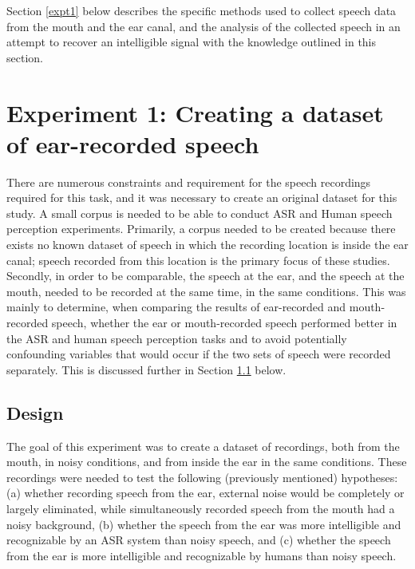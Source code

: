 \documentclass[dissertation,copyright]{uathesis}
\begin{document}
Section \ref{expt1} below describes the specific methods used to collect speech data from the mouth and the ear canal, and the analysis of the collected speech in an attempt to recover an intelligible signal with the knowledge outlined in this section.


\section{Experiment 1: Creating a dataset of ear-recorded speech\label{expt1}}

There are numerous constraints and requirement for the speech recordings required for this task, and it was necessary to create an original dataset for this study.  A small corpus is needed to be able to conduct ASR and Human speech perception experiments.  Primarily, a corpus needed to be created because there exists no known dataset of speech in which the recording location is inside the ear canal; speech recorded from this location is the primary focus of these studies.  Secondly, in order to be comparable, the speech at the ear, and the speech at the mouth, needed to be recorded at the same time, in the same conditions.  This was mainly to determine, when comparing the results of ear-recorded and mouth-recorded speech, whether the ear or mouth-recorded speech performed better in the ASR and human speech perception tasks and to avoid potentially confounding variables that would occur if the two sets of speech were recorded separately. This is discussed further in Section \ref{exp1design} below.

\subsection{Design}
\label{exp1design}
   
The goal of this experiment was to create a dataset of recordings, both from the mouth, in noisy conditions, and from inside the ear in the same conditions.  These recordings were needed to test the following (previously mentioned) hypotheses: (a) whether recording speech from the ear, external noise would be completely or largely eliminated, while simultaneously recorded speech from the mouth had a noisy background, (b) whether the speech from the ear was more intelligible and recognizable by an ASR system than noisy speech, and (c) whether the speech from the ear is more intelligible and recognizable by humans than noisy speech. 
\end{document}
